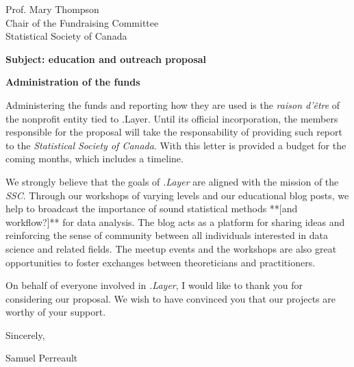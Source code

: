\documentclass[11pt, a4paper]{letter} %
\begin{document}
\begin{letter}{
	Prof. Mary Thompson\\
	Chair of the Fundraising Committee\\
	Statistical Society of Canada
	
	\bigskip
	\textbf{Subject: education and outreach proposal}%
}
\bigskip
\noindent \textbf{Administration of the funds}

Administering the funds and reporting how they are used is the \emph{raison d'\^{e}tre} of the nonprofit entity tied to .Layer. Until its official incorporation, the members responsible for the proposal will take the responsability of providing such report to the \emph{Statistical Society of Canada}. With this letter is provided a budget for the coming months, which includes a timeline.

\bigskip

We strongly believe that the goals of \emph{.Layer} are aligned with the mission of the \emph{SSC}. Through our workshops of varying levels and our educational blog posts, we help to broadcast the importance of sound statistical methods **[and workflow?]** for data analysis. The blog acts as a platform for sharing ideas and reinforcing the sense of community between all individuals interested in data science and related fields. The meetup events and the workshops are also great opportunities to foster exchanges between theoreticians and practitioners.

On behalf of everyone involved in \emph{.Layer}, I would like to thank you for considering our proposal. We wish to have convinced you that our projects are worthy of your support.

\closing{Sincerely,}

\noindent Samuel Perreault




\end{letter}
\end{document}
